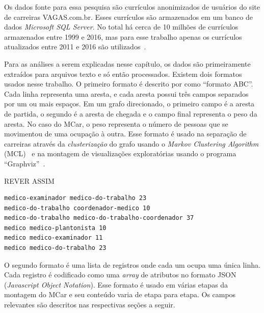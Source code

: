 \documentclass[12pt,a4paper]{article}
\theoremstyle{hypo}
\begin{document}
Os dados fonte para essa pesquisa são currículos anonimizados de usuários do site de carreiras VAGAS.com.br. Esses currículos são armazenados em um banco de dados \textit{Microsoft SQL Server}. No total há cerca de 10 milhões de currículos~ armazenados entre 1999 e 2016, mas para esse trabalho apenas os currículos atualizados entre 2011 e 2016 são utilizados~.


Para as análises a serem explicadas nesse capítulo, os dados são primeiramente extraídos para arquivos texto e só então processados. Existem dois formatos usados nesse trabalho. O primeiro formato é descrito por  como \enquote{formato ABC}. Cada linha representa uma aresta, e cada aresta possui três campos separados por um ou mais espaços. Em um grafo direcionado, o primeiro campo é a aresta de partida, o segundo é a aresta de chegada e o campo final representa o peso da aresta. No caso do MCar, o peso representa o número de pessoas que se movimentou de uma ocupação à outra. Esse formato é usado na separação de carreiras através da \textit{clusterização} do grafo usando o \textit{Markov Clustering Algorithm} (MCL)~\cite{Van_Dongen2000-qm} e na montagem de visualizações exploratórias usando o programa \enquote{Graphviz}~\cite{Gansner2000-oo}.

\noindent
REVER ASSIM\begin{minipage}{\linewidth}
\begin{lstlisting}[frame=single,caption=Arquivo em Formato ABC,label=lst:formato-abc,captionpos=b]
medico-examinador medico-do-trabalho 23
medico-do-trabalho coordenador-medico 10
medico-do-trabalho medico-do-trabalho-coordenador 37
medico medico-plantonista 10
medico medico-examinador 11
medico medico-do-trabalho 23
\end{lstlisting}
\end{minipage}

O segundo formato é uma lista de registros onde cada um ocupa uma única linha. Cada registro é codificado como uma \textit{array} de atributos no formato JSON (\textit{Javascript Object Notation}). Esse formato é usado em várias etapas da montagem do MCar e seu conteúdo varia de etapa para etapa. Os campos relevantes são descritos nas respectivas seções a seguir.
\end{document}
